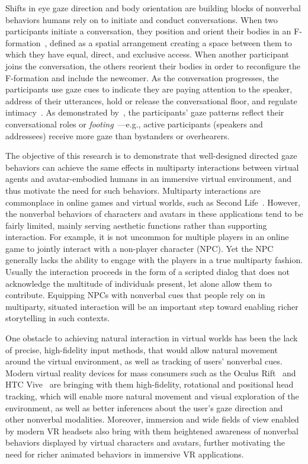 Shifts in eye gaze direction and body orientation are building blocks of nonverbal behaviors humans rely on to initiate and conduct conversations. When two participants initiate a conversation, they position and orient their bodies in an F-formation~\citep{kendon1990conducting}, defined as a spatial arrangement creating a space between them to which they have equal, direct, and exclusive access. When another participant joins the conversation, the others reorient their bodies in order to reconfigure the F-formation and include the newcomer. As the conversation progresses, the participants use gaze cues to indicate they are paying attention to the speaker, address of their utterances, hold or release the conversational floor, and regulate intimacy~\citep{heylen2006head}. As demonstrated by~\citet{mutlu2012conversational}, the participants' gaze patterns reflect their conversational roles or \emph{footing}~\citep{goffman1979footing}---e.g., active participants (speakers and addressees) receive more gaze than bystanders or overhearers.

The objective of this research is to demonstrate that well-designed directed gaze behaviors can achieve the same effects in multiparty interactions between virtual agents and avatar-embodied humans in an immersive virtual environment, and thus motivate the need for such behaviors. Multiparty interactions are commonplace in online games and virtual worlds, such as Second Life~\citep{secondlife}. However, the nonverbal behaviors of characters and avatars in these applications tend to be fairly limited, mainly serving aesthetic functions rather than supporting interaction.
For example, it is not uncommon for multiple players in an online game to jointly interact with a non-player character (NPC). Yet the NPC generally lacks the ability to engage with the players in a true multiparty fashion. Usually the interaction proceeds in the form of a scripted dialog that does not acknowledge the multitude of individuals present, let alone allow them to contribute. Equipping NPCs with nonverbal cues that people rely on in multiparty, situated interaction will be an important step toward enabling richer storytelling in such contexts.

One obstacle to achieving natural interaction in virtual worlds has been the lack of precise, high-fidelity input methods, that would allow natural movement around the virtual environment, as well as tracking of users' nonverbal cues. Modern virtual reality devices for mass consumers such as the Oculus Rift~\citep{oculus} and HTC Vive~\citep{vive} are bringing with them high-fidelity, rotational and positional head tracking, which will enable more natural movement and visual exploration of the environment, as well as better inferences about the user's gaze direction and other nonverbal modalities. Moreover, immersion and wide fields of view enabled by modern VR headsets also bring with them heightened awareness of nonverbal behaviors displayed by virtual characters and avatars, further motivating the need for richer animated behaviors in immersive VR applications.

